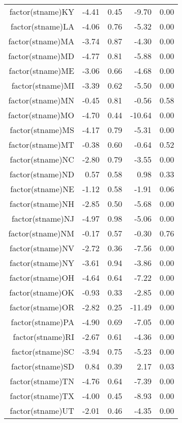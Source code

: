 \begin{table}[ht]
\begin{tabular}{rrrrr}
  factor(stname)KY & -4.41 & 0.45 & -9.70 & 0.00 \\ 
  factor(stname)LA & -4.06 & 0.76 & -5.32 & 0.00 \\ 
  factor(stname)MA & -3.74 & 0.87 & -4.30 & 0.00 \\ 
  factor(stname)MD & -4.77 & 0.81 & -5.88 & 0.00 \\ 
  factor(stname)ME & -3.06 & 0.66 & -4.68 & 0.00 \\ 
  factor(stname)MI & -3.39 & 0.62 & -5.50 & 0.00 \\ 
  factor(stname)MN & -0.45 & 0.81 & -0.56 & 0.58 \\ 
  factor(stname)MO & -4.70 & 0.44 & -10.64 & 0.00 \\ 
  factor(stname)MS & -4.17 & 0.79 & -5.31 & 0.00 \\ 
  factor(stname)MT & -0.38 & 0.60 & -0.64 & 0.52 \\ 
  factor(stname)NC & -2.80 & 0.79 & -3.55 & 0.00 \\ 
  factor(stname)ND & 0.57 & 0.58 & 0.98 & 0.33 \\ 
  factor(stname)NE & -1.12 & 0.58 & -1.91 & 0.06 \\ 
  factor(stname)NH & -2.85 & 0.50 & -5.68 & 0.00 \\ 
  factor(stname)NJ & -4.97 & 0.98 & -5.06 & 0.00 \\ 
  factor(stname)NM & -0.17 & 0.57 & -0.30 & 0.76 \\ 
  factor(stname)NV & -2.72 & 0.36 & -7.56 & 0.00 \\ 
  factor(stname)NY & -3.61 & 0.94 & -3.86 & 0.00 \\ 
  factor(stname)OH & -4.64 & 0.64 & -7.22 & 0.00 \\ 
  factor(stname)OK & -0.93 & 0.33 & -2.85 & 0.00 \\ 
  factor(stname)OR & -2.82 & 0.25 & -11.49 & 0.00 \\ 
  factor(stname)PA & -4.90 & 0.69 & -7.05 & 0.00 \\ 
  factor(stname)RI & -2.67 & 0.61 & -4.36 & 0.00 \\ 
  factor(stname)SC & -3.94 & 0.75 & -5.23 & 0.00 \\ 
  factor(stname)SD & 0.84 & 0.39 & 2.17 & 0.03 \\ 
  factor(stname)TN & -4.76 & 0.64 & -7.39 & 0.00 \\ 
  factor(stname)TX & -4.00 & 0.45 & -8.93 & 0.00 \\ 
  factor(stname)UT & -2.01 & 0.46 & -4.35 & 0.00 \\ 

\end{tabular}
\end{table}
